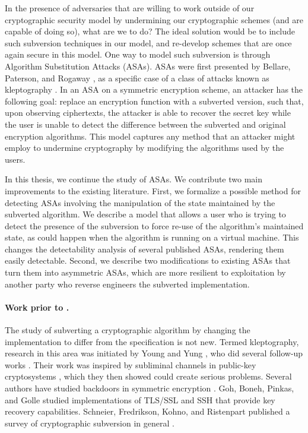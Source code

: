 In the presence of adversaries that are willing to work outside of our cryptographic security model by undermining our cryptographic schemes (and are capable of doing so), what are we to do? The ideal solution would be to include such subversion techniques in our model, and re-develop schemes that are once again secure in this model. One way to model such subversion is through Algorithm Substitution Attacks (ASAs). ASAs were first presented by Bellare, Paterson, and Rogaway \cite{C:BelPatRog14}, as a specific case of a class of attacks known as kleptography \cite{C:YouYun96,EC:YouYun97,FSE:YouYun98,SAC:YouYun04,ACISP:YouYun03}. In an ASA on a symmetric encryption scheme, an attacker has the following goal: replace an encryption function with a subverted version, such that, upon observing ciphertexts, the attacker is able to recover the secret key while the user is unable to detect the difference between the subverted and original encryption algorithms. This model captures any method that an attacker might employ to undermine cryptography by modifying the algorithms used by the users.

In this thesis, we continue the study of ASAs. We contribute two main improvements to the existing literature. First, we formalize a possible method for detecting ASAs involving the manipulation of the state maintained by the subverted algorithm. We describe a model that allows a user who is trying to detect the presence of the subversion to force re-use of the algorithm's maintained state, as could happen when the algorithm is running on a virtual machine. This changes the detectability analysis of several published ASAs, rendering them easily detectable. Second, we describe two modifications to existing ASAs that turn them into asymmetric ASAs, which are more resilient to exploitation by another party who reverse engineers the subverted implementation.

\paragraph{Work prior to \cite{C:BelPatRog14}.} The study of subverting a cryptographic algorithm by changing the implementation to differ from the specification is not new. Termed kleptography, research in this area was initiated by Young and Yung \cite{C:YouYun96}, who did several follow-up works  \cite{EC:YouYun97,FSE:YouYun98,SAC:YouYun04,ACISP:YouYun03}. Their work was inspired by subliminal channels in public-key cryptosystems \cite{EC:Simmons84,C:Desmedt88}, which they then showed could create serious problems. Several authors have studied backdoors in symmetric encryption \cite{FSE:RijPre97,FSE:Paterson99}. Goh, Boneh, Pinkas, and Golle \cite{ISC:GBPG03} studied implementations of TLS/SSL and SSH that provide key recovery capabilities. Schneier, Fredrikson, Kohno, and Ristenpart published a survey of cryptographic subversion in general \cite{EPRINT:SFKR15}.

